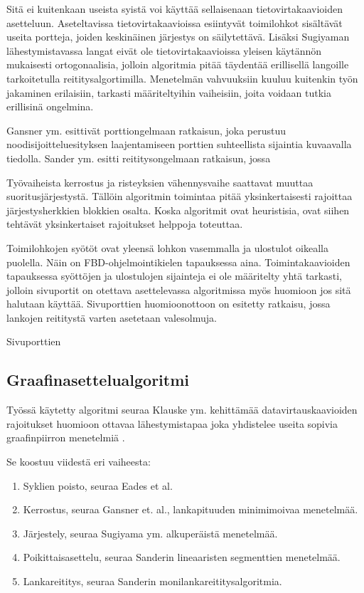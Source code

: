 \documentclass[finnish,12pt]{article}
\begin{document}
Sitä ei kuitenkaan useista syistä voi käyttää sellaisenaan tietovirtakaavioiden asetteluun.
Aseteltavissa tietovirtakaavioissa esiintyvät toimilohkot sisältävät useita portteja, joiden keskinäinen järjestys on säilytettävä.
Lisäksi Sugiyaman lähestymistavassa langat eivät ole tietovirtakaavioissa yleisen käytännön mukaisesti ortogonaalisia, jolloin algoritmia pitää täydentää erillisellä langoille tarkoitetulla reititysalgortimilla.
Menetelmän vahvuuksiin kuuluu kuitenkin työn jakaminen erilaisiin, tarkasti määriteltyihin vaiheisiin, joita voidaan tutkia erillisinä ongelmina.

Gansner ym. esittivät porttiongelmaan ratkaisun, joka perustuu noodisijoitteluesityksen laajentamiseen porttien suhteellista sijaintia kuvaavalla tiedolla.\cite{RefWorks:28}
Sander ym. esitti reititysongelmaan ratkaisun, jossa 

Työvaiheista kerrostus ja risteyksien vähennysvaihe saattavat muuttaa suoritusjärjestystä.
Tällöin algoritmin toimintaa pitää yksinkertaisesti rajoittaa järjestysherkkien blokkien osalta.
Koska algoritmit ovat heuristisia, ovat siihen tehtävät yksinkertaiset rajoitukset helppoja toteuttaa.

Toimilohkojen syötöt ovat yleensä lohkon vasemmalla ja ulostulot oikealla puolella.
Näin on FBD-ohjelmointikielen tapauksessa aina.
Toimintakaavioiden tapauksessa syöttöjen ja ulostulojen sijainteja ei ole määritelty yhtä tarkasti, jolloin sivuportit on otettava asettelevassa algoritmissa myös huomioon jos sitä halutaan käyttää.
Sivuporttien huomioonottoon on esitetty ratkaisu, jossa lankojen reititystä varten asetetaan valesolmuja. \cite{RefWorks:51}
 
Sivuporttien 

		\subsection{Graafinasettelualgoritmi}

Työssä käytetty algoritmi seuraa Klauske ym. kehittämää datavirtauskaavioiden rajoitukset huomioon ottavaa lähestymistapaa joka yhdistelee useita sopivia graafinpiirron menetelmiä \cite{RefWorks:50}.

Se koostuu viidestä eri vaiheesta:
\begin{enumerate}
  \item Syklien poisto, seuraa Eades et al.\cite{RefWorks:48}
  \item Kerrostus, seuraa Gansner et. al., lankapituuden minimimoivaa menetelmää. \cite{RefWorks:28}
  \item Järjestely, seuraa Sugiyama ym. alkuperäistä menetelmää. \cite{RefWorks:9}
  \item Poikittaisasettelu, seuraa Sanderin lineaaristen segmenttien menetelmää. \cite{RefWorks:49}
  \item Lankareititys, seuraa Sanderin monilankareititysalgoritmia. \cite{RefWorks:17}
\end{enumerate}
\end{document}
